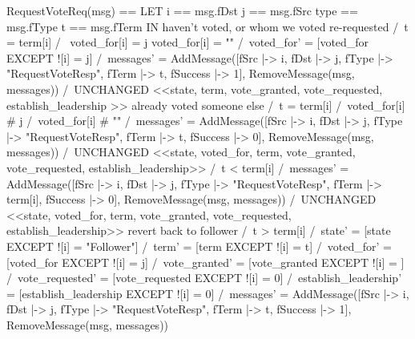 \begin{tla}
RequestVoteReq(msg) == 
    LET 
        i == msg.fDst
        j == msg.fSrc
        type == msg.fType
        t == msg.fTerm
    IN 
        \* haven't voted, or whom we voted re-requested
        \/ /\ t = term[i]
           /\ \/ voted_for[i] = j 
              \/ voted_for[i] = ""
           /\ voted_for' = [voted_for EXCEPT ![i] = j]
           /\ messages' = AddMessage([fSrc |-> i, 
                                        fDst |-> j, 
                                        fType |-> "RequestVoteResp",
                                        fTerm |-> t, 
                                        fSuccess |-> 1],
                                        RemoveMessage(msg, messages))
           /\ UNCHANGED <<state, term, vote_granted, 
                vote_requested, establish_leadership >>
        \* already voted someone else
        \/ /\ t = term[i]
           /\ voted_for[i] # j 
           /\ voted_for[i] # ""
           /\ messages' = AddMessage([fSrc |-> i, 
                                        fDst |-> j, 
                                        fType |-> "RequestVoteResp",
                                        fTerm |-> t, 
                                        fSuccess |-> 0],
                                        RemoveMessage(msg, messages))
            /\ UNCHANGED <<state, voted_for, term, 
                vote_granted, vote_requested, establish_leadership>>
        \/  /\ t < term[i]
            /\ messages' = AddMessage([fSrc |-> i, 
                                        fDst |-> j, 
                                        fType |-> "RequestVoteResp",
                                        fTerm |-> term[i], 
                                        fSuccess |-> 0],
                                        RemoveMessage(msg, messages))
            /\ UNCHANGED <<state, voted_for, term, 
                vote_granted, vote_requested, establish_leadership>>
        \* revert back to follower
        \/  /\ t > term[i]
            /\ state' = [state EXCEPT ![i] = "Follower"]
            /\ term' = [term EXCEPT ![i] = t]
            /\ voted_for' = [voted_for EXCEPT ![i] = j]
            /\ vote_granted' = [vote_granted EXCEPT ![i] = {}]
            /\ vote_requested' = [vote_requested EXCEPT ![i] = 0]
            /\ establish_leadership' = [establish_leadership EXCEPT ![i] = 0]
            /\ messages' = AddMessage([fSrc |-> i, 
                                        fDst |-> j, 
                                        fType |-> "RequestVoteResp",
                                        fTerm |-> t, 
                                        fSuccess |-> 1],
                                        RemoveMessage(msg, messages))
\end{tla}

